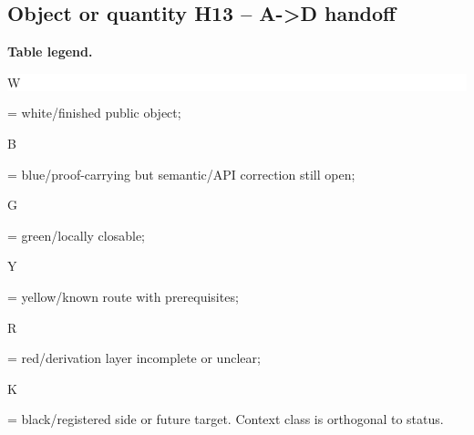 \subsection*{Object or quantity H13 -- A->D handoff}
\hypertarget{objproof:H13}{}
\par\smallskip\noindent\begin{minipage}{0.99\linewidth}\footnotesize\raggedright\textbf{Table legend.} \colorbox{white}{\strut W} = white/finished public object; \colorbox{cyan!20}{\strut B} = blue/proof-carrying but semantic/API correction still open; \colorbox{green!18}{\strut G} = green/locally closable; \colorbox{yellow!25}{\strut Y} = yellow/known route with prerequisites; \colorbox{red!20}{\strut R} = red/derivation layer incomplete or unclear; \colorbox{black!18}{\strut K} = black/registered side or future target. Context class is orthogonal to status.\end{minipage}\par\vspace{0.25em}
